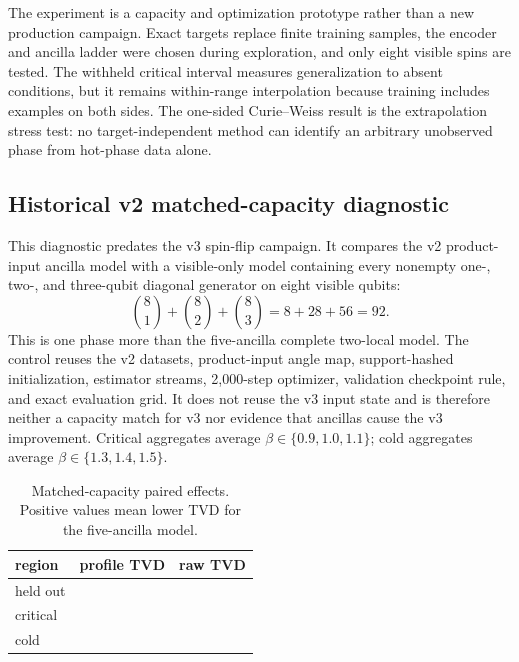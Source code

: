 The experiment is a capacity and optimization prototype rather than a new
production campaign. Exact targets replace finite training samples, the
encoder and ancilla ladder were chosen during exploration, and only eight
visible spins are tested. The withheld critical interval measures
generalization to absent conditions, but it remains within-range
interpolation because training includes examples on both sides. The one-sided
Curie--Weiss result is the extrapolation stress test: no target-independent
method can identify an arbitrary unobserved phase from hot-phase data alone.

\subsection{Historical v2 matched-capacity diagnostic}

This diagnostic predates the v3 spin-flip campaign. It compares the v2
product-input ancilla model with a visible-only model containing every
nonempty one-, two-, and three-qubit diagonal generator on eight visible
qubits:
\begin{equation}
 \binom81+\binom82+\binom83=8+28+56=92.
\end{equation}
This is one phase more than the five-ancilla complete two-local model. The
control reuses the v2 datasets, product-input angle map, support-hashed
initialization, estimator streams, 2,000-step optimizer, validation checkpoint
rule, and exact evaluation grid. It does not reuse the v3 input state and is
therefore neither a capacity match for v3 nor evidence that ancillas cause the
v3 improvement. Critical aggregates average
$\beta\in\{0.9,1.0,1.1\}$; cold aggregates average
$\beta\in\{1.3,1.4,1.5\}$.

\ifcapacitycontrolresults
\begin{table}[t]
\centering
\caption{Matched-capacity paired effects. Positive values mean lower TVD for
the five-ancilla model.}
\label{tab:capacity-effects}
\begin{tabular}{lcc}
\toprule
region & profile TVD & raw TVD\\
\midrule
held out & \CapacityProfileHeldOut{} & \CapacityRawHeldOut{}\\
critical & \CapacityProfileCritical{} & \CapacityRawCritical{}\\
cold & \CapacityProfileCold{} & \CapacityRawCold{}\\
\bottomrule
\end{tabular}
\end{table}
\fi

